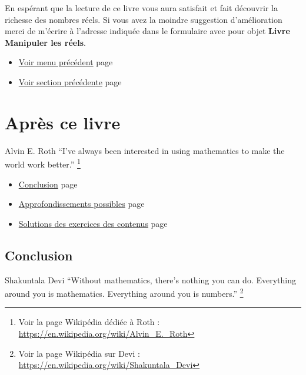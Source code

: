 \documentclass[a4paper,11pt]{book}
\begin{document}
En espérant que la lecture de ce livre vous aura satisfait et fait
découvrir la richesse des nombres réels. Si vous avez la moindre
suggestion d'amélioration merci de m'écrire à l'adresse
indiquée dans le formulaire avec pour objet \textbf{Livre Manipuler les
réels}.


\begin{itemize}
\item \hyperref[org82a5705]{Voir menu précédent}
page~\pageref{page:deeps-menu}
\item \hyperref[org419d7e0]{Voir section précédente}
page~\pageref{page:sec6.2bilan}
\end{itemize}


\clearpage

\part{Après ce livre}
\label{sec:org5cc24aa}
\label{org16db6b7}
\label{page:sec7after}

\begin{myquote}{Alvin E. Roth}
\enquote{I’ve always been interested in using mathematics to make the world
work better.}
\footnote{Voir la page Wikipédia dédiée à Roth : \url{https://en.wikipedia.org/wiki/Alvin_E._Roth}}
\end{myquote}


\clearpage

\label{org71f8d0a}
\label{page:after-menu}
\begin{itemize}
\item \hyperref[orgc860eab]{Conclusion} page \pageref{page:sec7.1conclusion}
\item \hyperref[org2f59ee6]{Approfondissements possibles} page \pageref{page:sec6deep}
\item \hyperref[orge8af971]{Solutions des exercices des contenus} page \pageref{page:sec8sols-contents}
\end{itemize}

\clearpage

\chapter{Conclusion}
\label{sec:org2af2cef}
\label{orgc860eab}
\label{page:sec7.1conclusion}

\begin{myquote}{Shakuntala Devi}
\enquote{Without mathematics, there’s nothing you can do. Everything around
you is mathematics. Everything around you is numbers.}
\footnote{Voir la page Wikipédia sur Devi : \url{https://en.wikipedia.org/wiki/Shakuntala_Devi}}
\end{myquote}
\end{document}
